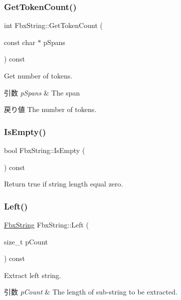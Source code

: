 \subsubsection{\texorpdfstring{Get\+Token\+Count()}{GetTokenCount()}}
{\footnotesize\ttfamily int Fbx\+String\+::\+Get\+Token\+Count (\begin{DoxyParamCaption}\item[{const char $\ast$}]{p\+Spans }\end{DoxyParamCaption}) const}

Get number of tokens. 
\begin{DoxyParams}{引数}
{\em p\+Spans} & The span \\
\hline
\end{DoxyParams}
\begin{DoxyReturn}{戻り値}
The number of tokens. 
\end{DoxyReturn}
\mbox{\label{class_fbx_string_af765fdc2a9878ae3474839ac6f6db525}} 
\subsubsection{\texorpdfstring{Is\+Empty()}{IsEmpty()}}
{\footnotesize\ttfamily bool Fbx\+String\+::\+Is\+Empty (\begin{DoxyParamCaption}{ }\end{DoxyParamCaption}) const}



Return {\ttfamily true} if string length equal zero. 

\mbox{\label{class_fbx_string_a61c3156aa112a9b2a2eba59b37db1feb}} 
\subsubsection{\texorpdfstring{Left()}{Left()}}
{\footnotesize\ttfamily \hyperlink{class_fbx_string}{Fbx\+String} Fbx\+String\+::\+Left (\begin{DoxyParamCaption}\item[{size\+\_\+t}]{p\+Count }\end{DoxyParamCaption}) const}

Extract left string. 
\begin{DoxyParams}{引数}
{\em p\+Count} & The length of sub-\/string to be extracted. \\
\hline
\end{DoxyParams}
\mbox{\label{class_fbx_string_ad4ee2f69df02ceb7614910cf32b04653}} 
